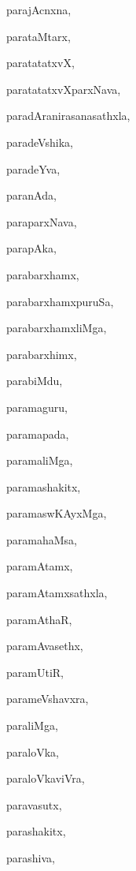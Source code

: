 \begin{multicols}{2}
{parajAcnxna}, \pageref{parajAcnxna}

{parataMtarx}, \pageref{parataMtarx}

{paratatatxvX}, \pageref{paratatatxvX}

{paratatatxvXparxNava}, \pageref{paratatatxvXparxNava}

{paradAranirasanasathxla}, \pageref{paradAranirasanasathxla}

{paradeVshika}, \pageref{paradeVshika}

{paradeYva}, \pageref{paradeYva}

{paranAda}, \pageref{paranAda}

{paraparxNava}, \pageref{paraparxNava}

{parapAka}, \pageref{parapAka}

{parabarxhamx}, \pageref{parabarxhamx}

{parabarxhamxpuruSa}, \pageref{parabarxhamxpuruSa}

{parabarxhamxliMga}, \pageref{parabarxhamxliMga}

{parabarxhimx}, \pageref{parabarxhimx}

{parabiMdu}, \pageref{parabiMdu}

{paramaguru}, \pageref{paramaguru}

{paramapada}, \pageref{paramapada}

{paramaliMga}, \pageref{paramaliMga}

{paramashakitx}, \pageref{paramashakitx}

{paramaswKAyxMga}, \pageref{paramaswKAyxMga}

{paramahaMsa}, \pageref{paramahaMsa}

{paramAtamx}, \pageref{paramAtamx}

{paramAtamxsathxla}, \pageref{paramAtamxsathxla}

{paramAthaR}, \pageref{paramAthaR}

{paramAvasethx}, \pageref{paramAvasethx}

{paramUtiR}, \pageref{paramUtiR}

{parameVshavxra}, \pageref{parameVshavxra}

{paraliMga}, \pageref{paraliMga}

{paraloVka}, \pageref{paraloVka}

{paraloVkaviVra}, \pageref{paraloVkaviVra}

{paravasutx}, \pageref{paravasutx}

{parashakitx}, \pageref{parashakitx}

{parashiva}, \pageref{parashiva}


\end{multicols}
